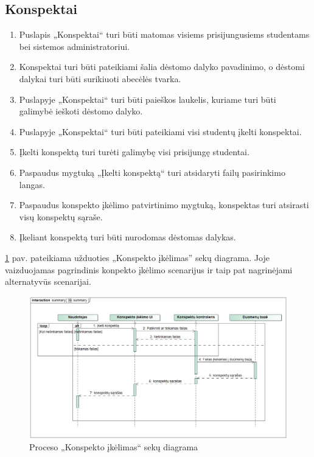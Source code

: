 \documentclass{VUMIFPSkursinis}
\begin{document}
\subsection{Konspektai}
\begin{enumerate}[label=FR11.\arabic*] 
	\item Puslapis „Konspektai“ turi būti matomas visiems prisijungusiems studentams bei sistemos administratoriui.
	\item Konspektai turi būti pateikiami šalia dėstomo dalyko pavadinimo, o dėstomi dalykai turi būti surikiuoti abecėlės tvarka.
	\item Puslapyje „Konspektai“ turi būti paieškos laukelis, kuriame turi būti galimybė ieškoti dėstomo dalyko.
	\item Puslapyje „Konspektai“ turi būti pateikiami visi studentų įkelti konspektai.
	\item Įkelti konspektą turi turėti galimybę visi prisijungę studentai.
	\item Paspaudus mygtuką „Įkelti konspektą“ turi atsidaryti failų pasirinkimo langas.
	\item Paspaudus konspekto įkėlimo patvirtinimo mygtuką, konspektas turi atsirasti visų konspektų sąraše.
	\item Įkeliant konspektą turi būti nurodomas dėstomas dalykas.\newline
\end{enumerate}

\ref{fig:summary} pav. pateikiama užduoties „Konspekto įkėlimas” sekų diagrama. Joje vaizduojamas pagrindinis konpekto įkėlimo scenarijus ir taip pat nagrinėjami alternatyvūs scenarijai.
\begin{figure}[H]
	\centering
	\includegraphics[width=\linewidth]{img/summary.jpg}
	\caption{Proceso „Konspekto įkėlimas“ sekų diagrama}
	\label{fig:summary}
\end{figure}
\newpage
\end{document}
